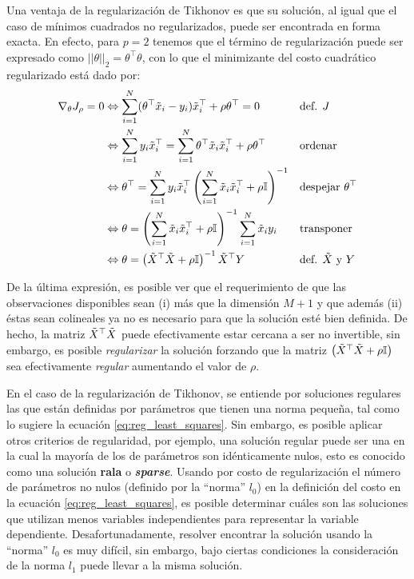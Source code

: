 Una ventaja de la regularización de Tikhonov es que su solución, al igual que el caso de mínimos cuadrados no regularizados, puede ser encontrada en forma exacta. En efecto, para $p=2$ tenemos que el término de regularización puede ser expresado como $||\theta||_2 = \theta^\top\theta$, con lo que el minimizante del costo cuadrático regularizado está dado por: 
\begin{align}
\nabla_\theta J_\rho=0 &\Leftrightarrow \sum_{i=1}^N(\theta^\top \tilde{x}_i - y_i)\tilde{x}_i^\top + \rho\theta^\top=0  							&&\text{def. $J$}\\  
&\Leftrightarrow \sum_{i=1}^Ny_i\tilde{x}_i^\top = \sum_{i=1}^N\theta^\top \tilde{x}_i\tilde{x}_i^\top + \rho\theta^\top					&&\text{ordenar}\\
&\Leftrightarrow \theta^\top = \sum_{i=1}^Ny_i\tilde{x}_i^\top \left(\sum_{i=1}^N \tilde{x}_i\tilde{x}_i^\top + \rho {\mathbb I}\right)^{-1}	&&\text{despejar $\theta^\top$}\\
&\Leftrightarrow \theta =  \left(\sum_{i=1}^N \tilde{x}_i\tilde{x}_i^\top +\rho {\mathbb I}\right)^{-1} \sum_{i=1}^N \tilde{x}_i y_i 		&&\text{transponer}\\
&\Leftrightarrow \theta = \left(\tilde{X}^\top\tilde{X} +\rho {\mathbb I}\right)^{-1} \tilde{X}^\top Y 											&&\text{def. $\tilde{X}$ y $Y$}
\end{align}

De la última expresión, es posible ver que el requerimiento de que las observaciones disponibles sean (i) más que la dimensión $M+1$ y que además (ii) éstas sean colineales ya no es necesario para que la solución esté bien definida. De hecho, la matriz $\tilde{X}^\top\tilde{X}$ puede efectivamente estar cercana a ser no invertible, sin embargo, es posible \emph{regularizar} la solución forzando que la matriz $\left(\tilde{X}^\top\tilde{X} +\rho {\mathbb I}\right)$ sea efectivamente \emph{regular} aumentando el valor de $\rho$. 

En el caso de la regularización de Tikhonov, se entiende por soluciones regulares las que están definidas por parámetros que tienen una norma pequeña, tal como lo sugiere la ecuación \eqref{eq:reg_least_squares}. Sin embargo, es posible aplicar otros criterios de regularidad, por ejemplo, una solución regular puede ser una en la cual la mayoría de los de parámetros son idénticamente nulos, esto es conocido como una solución \textbf{rala} o \textbf{\emph{sparse}}. Usando por costo de regularización el número de parámetros no nulos (definido por la ``norma'' $l_0$) en la definición del costo en la ecuación \eqref{eq:reg_least_squares}, es posible determinar cuáles son las soluciones que utilizan menos variables independientes para representar la variable dependiente. Desafortunadamente, resolver encontrar la solución usando la ``norma'' $l_0$ es muy difícil, sin embargo, bajo ciertas condiciones la consideración de la norma $l_1$ puede llevar a la misma solución.

